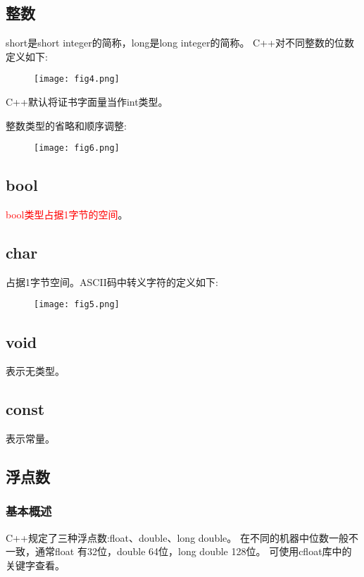 \documentclass{article}
\begin{document}
    \subsection{整数}
    short是short integer的简称，long是long integer的简称。
    C++对不同整数的位数定义如下:
    \begin{figure}[H]
        \centering
        \texttt{[image: fig4.png]}
    \end{figure}
    C++默认将证书字面量当作int类型。

    整数类型的省略和顺序调整:
    \begin{figure}[H]
        \centering
        \texttt{[image: fig6.png]}
    \end{figure}



    \subsection{bool}
    \textcolor{red}{bool类型占据1字节的空间}。

    \subsection{char}
    占据1字节空间。ASCII码中转义字符的定义如下:
    \begin{figure}[H]
        \centering
        \texttt{[image: fig5.png]}
    \end{figure}

    \subsection{void}
    表示无类型。

    \subsection{const}
    表示常量。

    \subsection{浮点数}
    \subsubsection{基本概述}
    C++规定了三种浮点数:float、double、long double。
    在不同的机器中位数一般不一致，通常float 有32位，double 64位，long double 128位。
    可使用cfloat库中的关键字查看。
\end{document}
